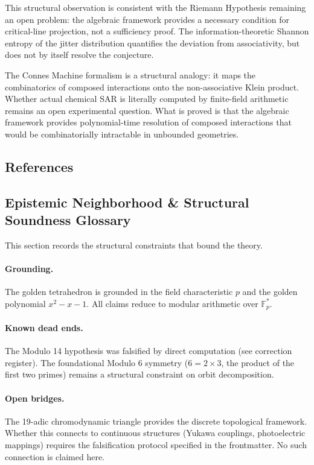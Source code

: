 This structural observation is consistent with the Riemann Hypothesis remaining an open problem: the algebraic framework provides a necessary condition for critical-line projection, not a sufficiency proof. The information-theoretic Shannon entropy of the jitter distribution quantifies the deviation from associativity, but does not by itself resolve the conjecture.

\begin{remark}
The Connes Machine formalism is a structural analogy: it maps
the combinatorics of composed interactions onto the non-associative
Klein product. Whether actual chemical SAR is literally computed
by finite-field arithmetic remains an open experimental question.
What is proved is that the algebraic framework provides
polynomial-time resolution of composed interactions that would
be combinatorially intractable in unbounded geometries.
\end{remark}


\subsection*{References}


\subsection*{Epistemic Neighborhood \& Structural Soundness Glossary}

This section records the structural constraints that bound the theory.

\paragraph{Grounding.} The golden tetrahedron is grounded in the field characteristic $p$ and the golden polynomial $x^2 - x - 1$. All claims reduce to modular arithmetic over $\mathbb{F}_p^*$.

\paragraph{Known dead ends.} The Modulo 14 hypothesis was falsified by direct computation (see correction register). The foundational Modulo 6 symmetry ($6 = 2 \times 3$, the product of the first two primes) remains a structural constraint on orbit decomposition.

\paragraph{Open bridges.} The 19-adic chromodynamic triangle provides the discrete topological framework. Whether this connects to continuous structures (Yukawa couplings, photoelectric mappings) requires the falsification protocol specified in the frontmatter. No such connection is claimed here.
